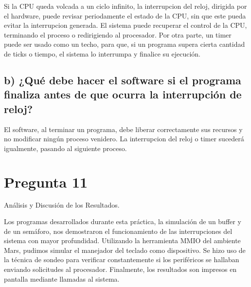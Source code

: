 \documentclass[12pt]{article}
\begin{document}
Si la CPU queda volcada a un ciclo infinito, la interrupcion del reloj, dirigida por el hardware, puede revisar periodamente el estado de la CPU, sin que este pueda evitar la interrupcion generada. El sistema puede recuperar el control de la CPU, terminando el proceso o redirigiendo al procesador. Por otra parte, un timer puede ser usado como un techo, para que, si un programa supera cierta cantidad de ticks o tiempo, el sistema lo interrumpa y finalice su ejecución.

\subsection*{b) ¿Qué debe hacer el software si el programa finaliza antes de que ocurra la interrupción de reloj?}

El software, al terminar un programa, debe liberar correctamente sus recursos y no modificar ningún proceso venidero. La interrupcion del reloj o timer sucederá igualmente, pasando al siguiente proceso.

\section*{Pregunta 11}
Análisis y Discusión de los Resultados.

Los programas desarrollados durante esta práctica, la simulación de un buffer y de un semáforo, nos demostraron el funcionamiento de las interrupciones del sistema con mayor profundidad. Utilizando la herramienta MMIO del ambiente Mars, pudimos simular el manejador del teclado como dispositivo. Se hizo uso de la técnica de sondeo para verificar constantemente si los periféricos se hallaban enviando solicitudes al procesador. Finalmente, los resultados son impresos en pantalla mediante llamadas al sistema.
\end{document}
